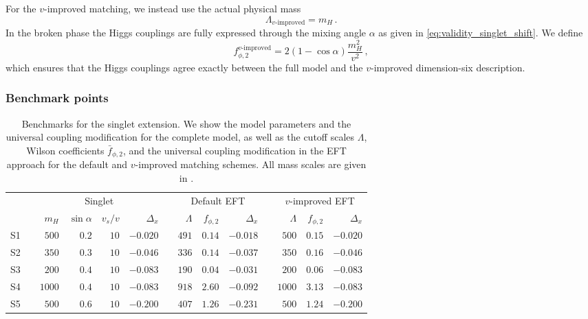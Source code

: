 For the $v$-improved matching, we instead use the actual physical mass
%
\begin{equation}
    \Lambda_{\text{$v$-improved}} = m_H \,.
\end{equation}
%
In the broken phase the Higgs couplings are fully expressed through
the mixing angle $\alpha$ as given in
\autoref{eq:validity_singlet_shift}. We define
%
\begin{equation}
  f_{\phi,2}^{\text{$v$-improved}} = 2 ( 1 - \cos \alpha) \frac {m_H^2} {v^2} \,,
\end{equation} 
%
which ensures that the Higgs couplings agree exactly between the full
model and the $v$-improved dimension-six description.



\subsubsection{Benchmark points}

\begin{table}
  \begin{tabular}{c c rrrr c rrr c rrr}
    \toprule
    \multirow{2}{*}{} && \multicolumn{4}{c}{Singlet} &&
    \multicolumn{3}{c}{Default EFT} && \multicolumn{3}{c}{$v$-improved EFT} \\
    \cmidrule{3-6} \cmidrule{8-10} \cmidrule{12-14}
    && $m_H$ & $\sin\alpha$ & $v_s/v$ & $\Delta_x$ &&
    $\Lambda$ & ${f}_{\phi,2}$ & $\Delta_x$ &&
    $\Lambda$ & ${f}_{\phi,2}$ & $\Delta_x$ \\
    \midrule
    S1 && $500$ & $0.2$ & $10$ & $-0.020$ && $491$ & $0.14$ & $-0.018$ && $500$ & $0.15$ & $-0.020$ \\
    S2 && $350$ & $0.3$ & $10$ & $-0.046$ && $336$ & $0.14$ &  $-0.037$ && $350$ & $0.16$ & $-0.046$ \\
    S3 && $200$ & $0.4$ & $10$ & $-0.083$ && $190$ & $0.04$ & $-0.031$ && $200$ & $0.06$ & $-0.083$ \\
    S4 && $1000$ & $0.4$ & $10$ & $-0.083$ && $918$ & $2.60$ & $-0.092$ && $1000$ & $3.13$ & $-0.083$ \\
    S5 && $500$ &  $0.6$ & $10$ & $-0.200$ && $407$ &$1.26$ & $-0.231$ && $500$ &  $1.24$ & $-0.200$ \\
    \bottomrule
    \end{tabular}
    \caption[Benchmarks for the singlet extension]{Benchmarks for the singlet extension.
      We show the model parameters and the universal coupling modification for the complete
      model, as well as the cutoff scales $\Lambda$, Wilson coefficients $\bar{f}_{\phi,2}$, and the
      universal coupling modification in the EFT approach for the default and $v$-improved
      matching schemes. All mass scales are given in \gev.}
  \label{tbl:validity_singlet_benchmarks}
\end{table}

